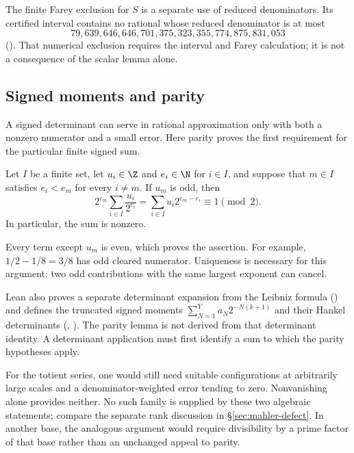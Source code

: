 The finite Farey exclusion for $S$ is a separate use of reduced
denominators. Its certified interval contains no rational whose reduced
denominator is at most
\[
 79{,}639{,}646{,}646{,}701{,}375{,}323{,}355{,}774{,}875{,}831{,}053
\]
().
That numerical exclusion requires the interval and Farey calculation;
it is not a consequence of the scalar lemma alone.

\subsection{Signed moments and parity}

A signed determinant can serve in rational approximation only with
both a nonzero numerator and a small error. Here parity proves the
first requirement for the particular finite signed sum.

\begin{lem}\label{lem:nonvanishing-unique-largest-denominator-exponent}
Let $I$ be a finite set, let $u_i\in\Z$ and $e_i\in\N$ for $i\in I$,
and suppose that $m\in I$ satisfies $e_i<e_m$ for every $i\ne m$.
If $u_m$ is odd, then
\[
 2^{e_m}\sum_{i\in I}\frac{u_i}{2^{e_i}}
   =\sum_{i\in I}u_i2^{e_m-e_i}\equiv1\pmod2.
\]
In particular, the sum is nonzero.
\end{lem}
Every term except $u_m$ is even, which proves the assertion. For
example, $1/2-1/8=3/8$ has odd cleared numerator. Uniqueness is
necessary for this argument: two odd contributions with the same
largest exponent can cancel.

Lean also proves a separate determinant expansion from the Leibniz
formula
()
and defines the truncated signed moments
$\sum_{N=1}^Y a_N2^{-N(k+1)}$ and their Hankel determinants
(,
). The parity lemma
is not derived from that determinant identity. A determinant application
must first identify a sum to which the parity hypotheses apply.

For the totient series, one would still need suitable configurations at
arbitrarily large scales and a denominator-weighted error tending to
zero. Nonvanishing alone provides neither. No such family is supplied
by these two algebraic statements; compare the separate rank discussion
in \S\ref{sec:mahler-defect}. In another base, the analogous argument
would require divisibility by a prime factor of that base rather than
an unchanged appeal to parity.

